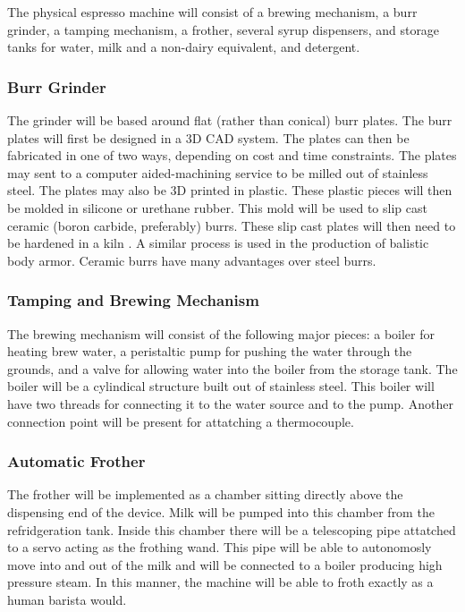 \documentclass[conference]{IEEEtran}
\begin{document}
The physical espresso machine will consist of a brewing mechanism, a
burr grinder, a tamping mechanism, a frother, several syrup dispensers, and
storage tanks for water, milk and a non-dairy equivalent, and detergent.

\subsubsection{Burr Grinder}
The grinder will be based around flat (rather than conical) burr plates. The
burr plates will first be designed in a 3D CAD system. The plates can then be
fabricated in one of two ways, depending on cost and time constraints. 
The plates may sent to a computer aided-machining service to be milled out of
stainless steel.
The plates may also be 3D printed in plastic. These plastic pieces will then be
molded in silicone or urethane rubber. This mold will be used to slip cast
ceramic (boron carbide, preferably) burrs. These slip cast plates will then need
to be hardened in a kiln \cite{slip}. A similar process is used in the
production of balistic body armor. Ceramic burrs have many advantages over steel burrs.

\subsubsection{Tamping and Brewing Mechanism}
The brewing mechanism will consist of the following major pieces: a boiler for
heating brew water, a peristaltic pump for pushing the water through the
grounds, and a valve for allowing water into the boiler from the storage tank.
The boiler will be a cylindical structure built out of stainless steel. This
boiler will have two threads for connecting it to the water source and to the
pump. Another connection point will be present for attatching a thermocouple.

\subsubsection{Automatic Frother}
The frother will be implemented as a chamber sitting directly above the
dispensing end of the device. Milk will be pumped into this chamber from the
refridgeration tank. Inside this chamber there will be a telescoping pipe
attatched to a servo acting as the frothing wand. This pipe will be able to
autonomosly move into and out of the milk and will be connected to a boiler
producing high pressure steam. In this manner, the machine will be able to froth
exactly as a human barista would.
\end{document}
